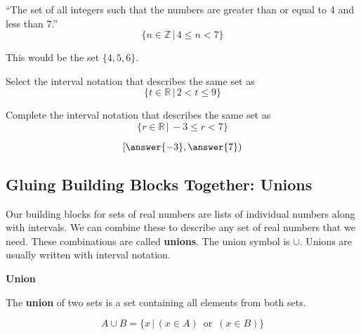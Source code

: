 \documentclass{ximera}
\begin{document}
\begin{example}
``The set of all integers such that the numbers are greater than or equal to 4 and less than 7.''
\[ \{ n \in \mathbb {Z} \, | \, 4 \leq n < 7 \} \]

\begin{explanation}
This would be the set $\{ 4, 5, 6 \}$.
\end{explanation}
\end{example}




\begin{question}
Select the interval notation that describes the same set as 
\[ \{ t \in \mathbb {R} \, | \, 2 < t \leq 9 \} \]
	\begin{multipleChoice}
	\choice {$[9, 2)$}
	\choice {$[2, 9)$}
	\choice [correct]{$(2, 9]$}
	\choice {$[2, 9]$}
	\end{multipleChoice}
\end{question}





\begin{question}
Complete the interval notation that describes the same set as 
\[ \{ r \in \mathbb {R} \, | \, -3 \leq r < 7 \} \]

\[
\left [ \answer{-3} , \answer{7} \right )
\]



\end{question}




















\subsection*{Gluing Building Blocks Together: Unions}

Our building blocks for sets of real numbers are lists of individual numbers along with intervals.  We can combine these to describe any set of real numbers that we need.  These combinations are called \textbf{unions}.  The union symbol is $\cup$. Unions are usually written with interval notation.



\begin{definition} \textbf{\textcolor{green!50!black}{Union}}

The \textbf{union} of two sets is a set containing all elements from both sets.


\[
A \cup B = \{  x \, | \, (x \in A) \, \text{ or } \, (x \in B)  \}
\]


\end{definition}
\end{document}
